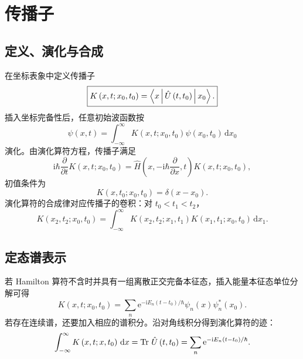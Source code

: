 \section{传播子}
\subsection{定义、演化与合成}
在坐标表象中定义传播子
\begin{equation}
\boxed{K\left(x,t;x_0,t_0\right)
=\Braket{x|\hat U\left(t,t_0\right)|x_0}.}
\label{eq:propagator-definition}
\end{equation}
插入坐标完备性后，任意初始波函数按
\begin{equation}
\psi\left(x,t\right)=\int_{-\infty}^{\infty}
K\left(x,t;x_0,t_0\right)\psi\left(x_0,t_0\right)\,\mathrm{d}x_0
\label{eq:wavefunction-propagation}
\end{equation}
演化。由演化算符方程，传播子满足
\begin{equation}
\mathrm{i}\hbar\frac{\partial}{\partial t}K\left(x,t;x_0,t_0\right)
=\hat H\left(x,-\mathrm{i}\hbar\frac{\partial}{\partial x},t\right)
K\left(x,t;x_0,t_0\right),
\end{equation}
初值条件为
\begin{equation}
K\left(x,t_0;x_0,t_0\right)=\delta\left(x-x_0\right).
\end{equation}
演化算符的合成律对应传播子的卷积：对 $t_0<t_1<t_2$，
\begin{equation}
\boxed{K\left(x_2,t_2;x_0,t_0\right)=
\int_{-\infty}^{\infty}K\left(x_2,t_2;x_1,t_1\right)
K\left(x_1,t_1;x_0,t_0\right)\,\mathrm{d}x_1.}
\label{eq:propagator-composition}
\end{equation}

\subsection{定态谱表示}
若 Hamilton 算符不含时并具有一组离散正交完备本征态，插入能量本征态单位分解可得
\begin{equation}
\boxed{K\left(x,t;x_0,t_0\right)=
\sum_n\mathrm{e}^{-\mathrm{i}E_n\left(t-t_0\right)/\hbar}
\psi_n\left(x\right)\psi_n^*\left(x_0\right).}
\label{eq:propagator-spectrum}
\end{equation}
若存在连续谱，还要加入相应的谱积分。沿对角线积分得到演化算符的迹：
\begin{equation}
\int_{-\infty}^{\infty}K\left(x,t;x,t_0\right)\,\mathrm{d}x
=\operatorname{Tr}\,\hat U\left(t,t_0\right)
=\sum_n\mathrm{e}^{-\mathrm{i}E_n\left(t-t_0\right)/\hbar}.
\end{equation}

